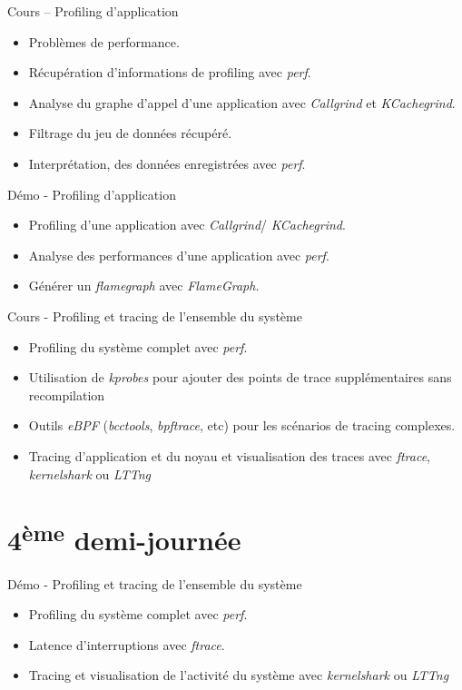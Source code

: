 \documentclass[a4paper,12pt,obeyspaces,spaces,hyphens]{article}
\begin{document}
\feagendatwocolumn
{Cours – Profiling d'application}
{
  \begin{itemize}
  \item Problèmes de performance.
  \item Récupération d'informations de profiling avec {\em perf}.
  \item Analyse du graphe d'appel d'une application avec {\em
      Callgrind} et {\em KCachegrind}.
  \item Filtrage du jeu de données récupéré.
  \item Interprétation, des données enregistrées avec {\em perf}.
  \end{itemize}
}
{Démo - Profiling d'application}
{
  \begin{itemize}
  \item Profiling d'une application avec {\em Callgrind}/{\em
      KCachegrind}.
  \item Analyse des performances d'une application avec {\em perf}.
  \item Générer un {\em flamegraph} avec {\em FlameGraph}.
  \end{itemize}
}

\feagendaonecolumn
{Cours - Profiling et tracing de l'ensemble du système}
{
  \begin{itemize}
  \item Profiling du système complet avec {\em perf}.
  \item Utilisation de {\em kprobes} pour ajouter des points de trace
    supplémentaires sans recompilation
  \item Outils {\em eBPF} ({\em bcctools}, {\em bpftrace}, etc) pour
    les scénarios de tracing complexes.
  \item Tracing d'application et du noyau et visualisation des traces
    avec {\em ftrace}, {\em kernelshark} ou {\em LTTng}
  \end{itemize}
}

\section{4\textsuperscript{ème} demi-journée}

\feagendaonecolumn
{Démo - Profiling et tracing de l'ensemble du système}
{
  \begin{itemize}
  \item Profiling du système complet avec {\em perf}.
  \item Latence d'interruptions avec {\em ftrace}.
  \item Tracing et visualisation de l'activité du système avec {\em
      kernelshark} ou {\em LTTng}
  \end{itemize}
}
\end{document}
